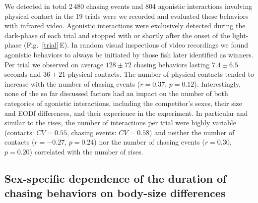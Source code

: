 \documentclass[vruler,JEB]{COB}%
\newcommand{\figitem}[1]{\textsf{\bfseries\uppercase{#1}}\penalty10000 }
\newcommand{\panel}[1]{\textsf{#1}}
\newcommand{\subfref}[2]{\textup{\ref{#1}}\,\panel{#2}}
\newcommand{\Figb}{Fig.}
\newcommand{\Subfigrefb}[2]{\Figb~\subfref{#1}{#2}}
\begin{document}

We detected in total 2\,480 chasing events and 804 agonistic interactions involving physical contact in the 19 trials were we recorded and evaluated these behaviors with infrared video. Agonistic interactions were exclusively detected during the dark-phase of each trial and stopped with or shortly after the onset of the light-phase (\Subfigrefb{trial}{E}). In random visual inspections of video recordings we found agonistic behaviors to always be initiated by those fish later identified as winners. Per trial we observed on average $128\pm 72$ chasing behaviors lasting $7.4\pm 6.5$ seconds and $36\pm 21$ physical contacts. The number of physical contacts tended to increase with the number of chasing events ($r=0.37$, $p=0.12$). Interestingly, none of the so far discussed factors had an impact on the number of both categories of agonistic interactions, including the competitor's sexes, their size and EODf differences, and their experience in the experiment. In particular and similar to the rises, the number of interactions per trial were highly variable (contacts: $CV=0.55$, chasing events: $CV=0.58$) and neither the number of contacts ($r=-0.27$, $p=0.24$) nor the number of chasing events ($r=0.30$, $p=0.20$) correlated with the number of rises.

\subsection{Sex-specific dependence of the duration of chasing behaviors on body-size differences}
\end{document}
